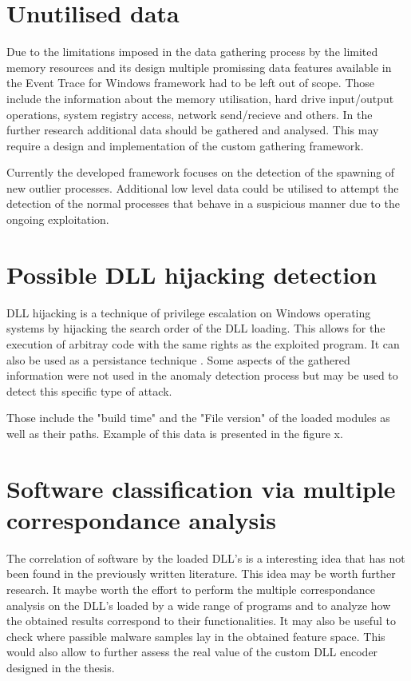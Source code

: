 \documentclass[a4paper,twoside,12pt]{book}
\begin{document}
\section{Unutilised data}

Due to the limitations imposed in the data gathering process by the limited memory resources and its
design multiple promissing data features available in the Event Trace for Windows framework had to be
left out of scope. Those include the information about the memory utilisation, hard drive input/output 
operations, system registry access, network send/recieve and others. In the further research additional 
data should be gathered and analysed. This may require a design and implementation of the custom  
gathering framework.

Currently the developed framework focuses on the detection of the spawning of new outlier processes.
Additional low level data could be utilised to attempt the detection of the normal processes that behave
in a suspicious manner due to the ongoing exploitation.

\section{Possible DLL hijacking detection}

DLL hijacking is a technique of privilege escalation on Windows operating systems by hijacking the 
search order of the DLL loading. This allows for the execution of arbitray code with the same rights 
as the exploited program. It can also be used as a persistance technique \cite{bib:DLLhijacking}.
Some aspects of the gathered information were not used in the anomaly detection process but may be
used to detect this specific type of attack. 

Those include the "build time" and the "File version" of the loaded modules as well as their paths.
Example of this data is presented in the figure x.

\section{Software classification via multiple correspondance analysis}

The correlation of software by the loaded DLL's is a interesting idea that has not been
found in the previously written literature. This idea may be worth further research. It maybe worth
the effort to perform the multiple correspondance analysis on the DLL's loaded by a wide range 
of programs and to analyze how the obtained results correspond to their functionalities. It may also
be useful to check where passible malware samples lay in the obtained feature space. This would also
allow to further assess the real value of the custom DLL encoder designed in the thesis. 
\end{document}
